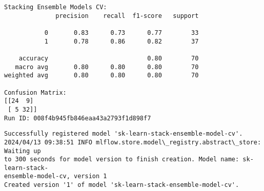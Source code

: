 \documentclass[11pt]{article}
\begin{document}
    \begin{Verbatim}[commandchars=\\\{\}]
Stacking Ensemble Models CV:
              precision    recall  f1-score   support

           0       0.83      0.73      0.77        33
           1       0.78      0.86      0.82        37

    accuracy                           0.80        70
   macro avg       0.80      0.80      0.80        70
weighted avg       0.80      0.80      0.80        70

Confusion Matrix:
[[24  9]
 [ 5 32]]
Run ID: 008f4b945fb846eaa43a2793f1d898f7
    \end{Verbatim}

    \begin{Verbatim}[commandchars=\\\{\}]
Successfully registered model 'sk-learn-stack-ensemble-model-cv'.
2024/04/13 09:38:51 INFO mlflow.store.model\_registry.abstract\_store: Waiting up
to 300 seconds for model version to finish creation. Model name: sk-learn-stack-
ensemble-model-cv, version 1
Created version '1' of model 'sk-learn-stack-ensemble-model-cv'.
    \end{Verbatim}
\end{document}
